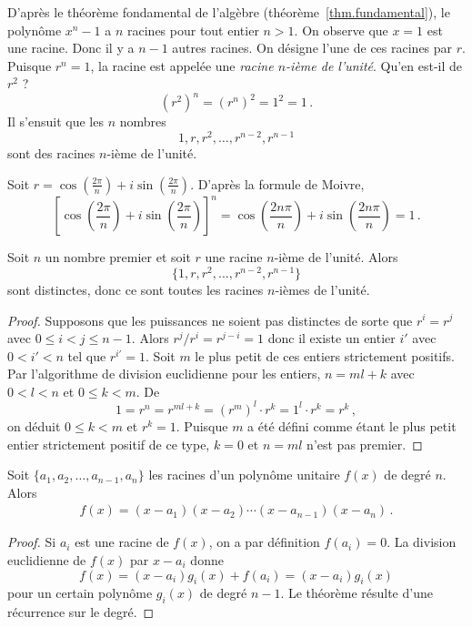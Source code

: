 D'après le théorème fondamental de l'algèbre (théorème~\ref{thm.fundamental}), le polynôme $x^{n}-1$ a $n$ racines pour tout entier $n> 1$. On observe que $x=1$ est une racine. Donc il y a $n-1$ autres racines. On désigne l'une de ces racines par $r$. Puisque $r^{n}=1$, la racine est appelée une \emph{racine $n$-ième de l'unité}. Qu'en est-il de $r^2$ ?
\[
(r^{2})^n=(r^{n})^2=1^2=1\,.
\]
Il s'ensuit que les $n$ nombres 
\[
1, r, r^2, \ldots, r^{n-2}, r^{n-1}
\]
sont des racines $n$-ième de l'unité.

\begin{advanced}
Soit $r=\cos \left(\frac{2\pi}{n}\right) + i\sin  \left(\frac{2\pi}{n}\right)$.
D'après la formule de Moivre,
\[
\left[\cos \left(\frac{2\pi}{n}\right) + i\sin  \left(\frac{2\pi}{n}\right)\right]^{n}=
\cos \left(\frac{2 n\pi}{n}\right) + i\sin  \left(\frac{2 n\pi}{n}\right)= 1\,.
\]
\vspace{-2ex}
\end{advanced}



\begin{theorem}
Soit $n$ un nombre premier et soit $r$ une racine $n$-ième  de l'unité. Alors 
\[
\{1,r,r^2,\ldots,r^{n-2},r^{n-1}\}
\]
sont distinctes, donc ce sont toutes les racines $n$-ièmes  de l'unité.
\end{theorem}

\begin{proof}
Supposons que les puissances ne soient pas distinctes de sorte que $r^i=r^j$ avec $0\leq i<j\leq n-1$. Alors $r^j/r^i=r^{j-i}=1$ donc il existe  un entier  $i'$ avec $0<i'<n$  tel que $r^{i'}=1$. Soit $m$ le plus petit de ces entiers strictement  positifs. Par l'algorithme de division euclidienne pour les entiers,  $n=ml+k$ avec $0<l<n$ et $0\leq k<m$. De 
\[
1=r^n=r^{ml+k}=(r^m)^l\cdot r^k=1^l\cdot r^k=r^k\,,
\]
on déduit $0\leq k<m$ et $r^k=1$. Puisque $m$ a été défini comme étant le plus petit entier strictement positif de ce type, $k=0$ et $n=ml$ n'est pas premier.
\end{proof}

\begin{theorem} Soit $\{a_1,a_2,\ldots,a_{n-1},a_n\}$ les racines d'un polynôme unitaire $f(x)$ de degré $n$. Alors 
\begin{align}\label{eq.viete}
f(x) =(x-a_1) (x-a_2)\cdots (x-a_{n-1})(x-a_n)\,.
\end{align}
\end{theorem}

\begin{proof}
Si $a_i$ est une racine de $f(x)$, on a par définition $f(a_i)=0$. La division euclidienne de $f(x)$ par $x-a_i$ donne  
\[
f(x)=(x-a_i)g_i(x)+f(a_i)=(x-a_i)g_i(x)\]
 pour un certain polynôme $g_i(x)$ de degré $n-1$. Le théorème résulte d'une  récurrence sur le degré.
\end{proof}

